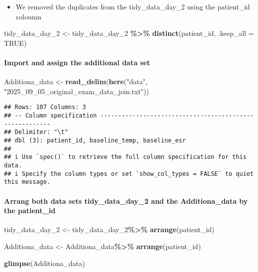 \documentclass[
]{article}
\newenvironment{Shaded}{\begin{snugshade}}{\end{snugshade}}
\newcommand{\AttributeTok}[1]{\textcolor[rgb]{0.13,0.29,0.53}{#1}}
\newcommand{\ConstantTok}[1]{\textcolor[rgb]{0.56,0.35,0.01}{#1}}
\newcommand{\FunctionTok}[1]{\textcolor[rgb]{0.13,0.29,0.53}{\textbf{#1}}}
\newcommand{\NormalTok}[1]{#1}
\newcommand{\OtherTok}[1]{\textcolor[rgb]{0.56,0.35,0.01}{#1}}
\newcommand{\SpecialCharTok}[1]{\textcolor[rgb]{0.81,0.36,0.00}{\textbf{#1}}}
\newcommand{\StringTok}[1]{\textcolor[rgb]{0.31,0.60,0.02}{#1}}
\providecommand{\tightlist}{%
  \setlength{\itemsep}{0pt}\setlength{\parskip}{0pt}}
\begin{document}
\begin{itemize}
\tightlist
\item
  We removed the duplicates from the tidy\_data\_day\_2 using the
  patient\_id coloumn
\end{itemize}

\begin{Shaded}
\begin{Highlighting}[]
\NormalTok{tidy\_data\_day\_2 }\OtherTok{\textless{}{-}}\NormalTok{ tidy\_data\_day\_2 }\SpecialCharTok{\%\textgreater{}\%}
  \FunctionTok{distinct}\NormalTok{(patient\_id, }\AttributeTok{.keep\_all =} \ConstantTok{TRUE}\NormalTok{)}
\end{Highlighting}
\end{Shaded}

\paragraph{Import and assign the additional data
set}\label{import-and-assign-the-additional-data-set}

\begin{Shaded}
\begin{Highlighting}[]
\NormalTok{Additiona\_data }\OtherTok{\textless{}{-}} \FunctionTok{read\_delim}\NormalTok{(}\FunctionTok{here}\NormalTok{(}\StringTok{"data"}\NormalTok{, }\StringTok{"2025\_09\_05\_original\_exam\_data\_join.txt"}\NormalTok{))}
\end{Highlighting}
\end{Shaded}

\begin{verbatim}
## Rows: 107 Columns: 3
## -- Column specification --------------------------------------------------------
## Delimiter: "\t"
## dbl (3): patient_id, baseline_temp, baseline_esr
## 
## i Use `spec()` to retrieve the full column specification for this data.
## i Specify the column types or set `show_col_types = FALSE` to quiet this message.
\end{verbatim}

\paragraph{Arrang both data sets tidy\_data\_day\_2 and the
Additiona\_data by the
patient\_id}\label{arrang-both-data-sets-tidy_data_day_2-and-the-additiona_data-by-the-patient_id}

\begin{Shaded}
\begin{Highlighting}[]
\NormalTok{tidy\_data\_day\_2 }\OtherTok{\textless{}{-}}\NormalTok{ tidy\_data\_day\_2}\SpecialCharTok{\%\textgreater{}\%}
  \FunctionTok{arrange}\NormalTok{(patient\_id)}

\NormalTok{Additiona\_data }\OtherTok{\textless{}{-}}\NormalTok{ Additiona\_data}\SpecialCharTok{\%\textgreater{}\%}
  \FunctionTok{arrange}\NormalTok{(patient\_id)}

\FunctionTok{glimpse}\NormalTok{(Additiona\_data)}
\end{Highlighting}
\end{Shaded}
\end{document}

